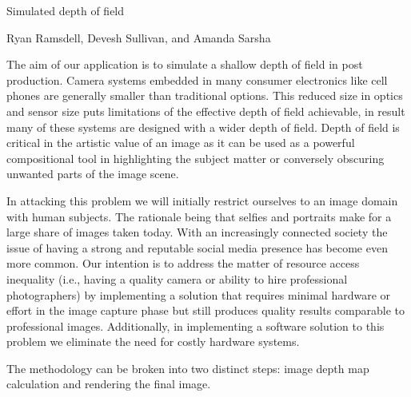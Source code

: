 \documentclass[12pt]{article}
\begin{document}
{\centering \Large Simulated depth of field

 \normalsize Ryan Ramsdell, Devesh Sullivan, and Amanda Sarsha \par\null}


The aim of our application is to simulate a shallow depth of field in post production. Camera systems embedded in many consumer electronics like cell phones are generally smaller than traditional options. This reduced size in optics and sensor size puts limitations of the effective depth of field achievable, in result many of these systems are designed with a wider depth of field. Depth of field is critical in the artistic value of an image as it can be used as a powerful compositional tool in highlighting the subject matter or conversely obscuring unwanted parts of the image scene.

In attacking this problem we will initially restrict ourselves to an image domain with human subjects.  The rationale being that selfies and portraits make for a large share of images taken today. With an increasingly connected society the issue of having a strong and reputable social media presence has become even more common. Our intention is to address the matter of resource access inequality (i.e., having a quality camera or ability to hire professional photographers) by implementing a solution that requires minimal hardware or effort in the image capture phase but still produces quality results comparable to professional images. Additionally, in implementing a software solution to this problem we eliminate the need for costly hardware systems. 

The methodology can be broken into two distinct steps: image depth map calculation and rendering the final image. 
\end{document}
